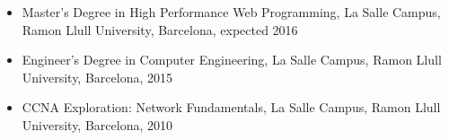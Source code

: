 \begin{itemize}

    \item Master's Degree in High Performance Web Programming, La Salle Campus, Ramon Llull University, Barcelona, expected 2016

    \item Engineer's Degree in Computer Engineering, La Salle Campus, Ramon Llull University, Barcelona, 2015

    \item CCNA Exploration: Network Fundamentals, La Salle Campus, Ramon Llull University, Barcelona, 2010

\end{itemize}